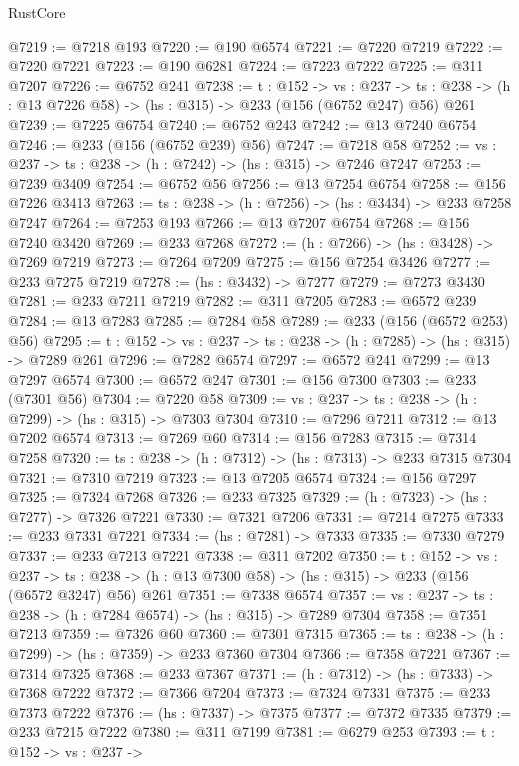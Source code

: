 \begin{lexlean}{RustCore}
\begin{coremodule}
@7219 := @7218 @193
@7220 := @190 @6574
@7221 := @7220 @7219
@7222 := @7220 @7221
@7223 := @190 @6281
@7224 := @7223 @7222
@7225 := @311 @7207
@7226 := @6752 @241
@7238 := {t : @152} ->
  {vs : @237} ->
  {ts : @238} -> (h : @13 @7226 @58) -> (hs : @315) -> @233 (@156 (@6752 @247) @56) @261
@7239 := @7225 @6754
@7240 := @6752 @243
@7242 := @13 @7240 @6754
@7246 := @233 (@156 (@6752 @239) @56)
@7247 := @7218 @58
@7252 := {vs : @237} -> {ts : @238} -> (h : @7242) -> (hs : @315) -> @7246 @7247
@7253 := @7239 @3409
@7254 := @6752 @56
@7256 := @13 @7254 @6754
@7258 := @156 @7226 @3413
@7263 := {ts : @238} -> (h : @7256) -> (hs : @3434) -> @233 @7258 @7247
@7264 := @7253 @193
@7266 := @13 @7207 @6754
@7268 := @156 @7240 @3420
@7269 := @233 @7268
@7272 := (h : @7266) -> (hs : @3428) -> @7269 @7219
@7273 := @7264 @7209
@7275 := @156 @7254 @3426
@7277 := @233 @7275 @7219
@7278 := (hs : @3432) -> @7277
@7279 := @7273 @3430
@7281 := @233 @7211 @7219
@7282 := @311 @7205
@7283 := @6572 @239
@7284 := @13 @7283
@7285 := @7284 @58
@7289 := @233 (@156 (@6572 @253) @56)
@7295 := {t : @152} -> {vs : @237} -> {ts : @238} -> (h : @7285) -> (hs : @315) -> @7289 @261
@7296 := @7282 @6574
@7297 := @6572 @241
@7299 := @13 @7297 @6574
@7300 := @6572 @247
@7301 := @156 @7300
@7303 := @233 (@7301 @56)
@7304 := @7220 @58
@7309 := {vs : @237} -> {ts : @238} -> (h : @7299) -> (hs : @315) -> @7303 @7304
@7310 := @7296 @7211
@7312 := @13 @7202 @6574
@7313 := @7269 @60
@7314 := @156 @7283
@7315 := @7314 @7258
@7320 := {ts : @238} -> (h : @7312) -> (hs : @7313) -> @233 @7315 @7304
@7321 := @7310 @7219
@7323 := @13 @7205 @6574
@7324 := @156 @7297
@7325 := @7324 @7268
@7326 := @233 @7325
@7329 := (h : @7323) -> (hs : @7277) -> @7326 @7221
@7330 := @7321 @7206
@7331 := @7214 @7275
@7333 := @233 @7331 @7221
@7334 := (hs : @7281) -> @7333
@7335 := @7330 @7279
@7337 := @233 @7213 @7221
@7338 := @311 @7202
@7350 := {t : @152} ->
  {vs : @237} ->
  {ts : @238} -> (h : @13 @7300 @58) -> (hs : @315) -> @233 (@156 (@6572 @3247) @56) @261
@7351 := @7338 @6574
@7357 := {vs : @237} -> {ts : @238} -> (h : @7284 @6574) -> (hs : @315) -> @7289 @7304
@7358 := @7351 @7213
@7359 := @7326 @60
@7360 := @7301 @7315
@7365 := {ts : @238} -> (h : @7299) -> (hs : @7359) -> @233 @7360 @7304
@7366 := @7358 @7221
@7367 := @7314 @7325
@7368 := @233 @7367
@7371 := (h : @7312) -> (hs : @7333) -> @7368 @7222
@7372 := @7366 @7204
@7373 := @7324 @7331
@7375 := @233 @7373 @7222
@7376 := (hs : @7337) -> @7375
@7377 := @7372 @7335
@7379 := @233 @7215 @7222
@7380 := @311 @7199
@7381 := @6279 @253
@7393 := {t : @152} ->
  {vs : @237} ->

\end{coremodule}
\end{lexlean}

